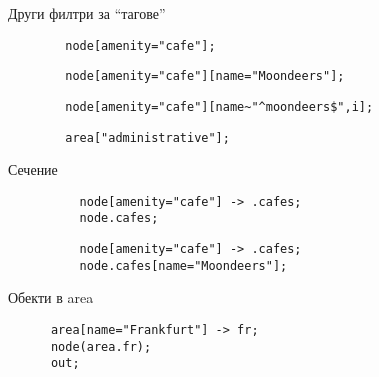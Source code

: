 \documentclass[9pt]{beamer}
\begin{document}
  \begin{frame}[fragile]{Други филтри за ``тагове''}
    \begin{lstwrap}\begin{lstlisting}
        node[amenity="cafe"];
    \end{lstlisting}\end{lstwrap}

    \begin{lstwrap}\begin{lstlisting}
        node[amenity="cafe"][name="Moondeers"];
    \end{lstlisting}\end{lstwrap}

    \begin{lstwrap}\begin{lstlisting}
        node[amenity="cafe"][name~"^moondeers$",i];
    \end{lstlisting}\end{lstwrap}

    \begin{lstwrap}\begin{lstlisting}
        area["administrative"];
    \end{lstlisting}\end{lstwrap}
  \end{frame}

  \begin{frame}[fragile]{Сечение}
      \begin{lstwrap}\begin{lstlisting}
          node[amenity="cafe"] -> .cafes;
          node.cafes;
      \end{lstlisting}\end{lstwrap}
      \begin{lstwrap}\begin{lstlisting}
          node[amenity="cafe"] -> .cafes;
          node.cafes[name="Moondeers"];
      \end{lstlisting}\end{lstwrap}
  \end{frame}

  \begin{frame}[fragile]{Обекти в area}
    \begin{lstwrap}\begin{lstlisting}
      area[name="Frankfurt"] -> fr;
      node(area.fr);
      out;
    \end{lstlisting}\end{lstwrap}
  \end{frame}
\end{document}
